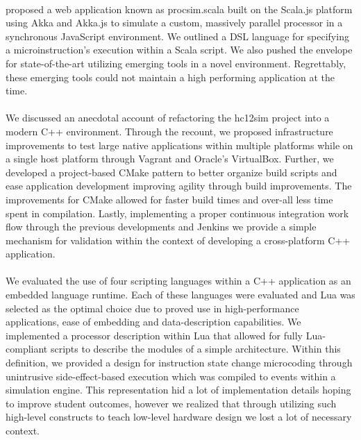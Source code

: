 \paragraph{}  proposed a web application known as procsim.scala built on the Scala.js platform using Akka and Akka.js to simulate a custom, massively parallel processor in a synchronous JavaScript environment. We outlined a DSL language for specifying a microinstruction's execution within a Scala script. We also pushed the envelope for state-of-the-art utilizing emerging tools in a novel environment. Regrettably, these emerging tools could not maintain a high performing application at the time.

\paragraph{} We discussed an anecdotal account of refactoring the hc12sim project into a modern C++ environment. Through the recount, we proposed infrastructure improvements to test large native applications within multiple platforms while on a single host platform through Vagrant and Oracle's VirtualBox. Further, we developed a project-based CMake pattern to better organize build scripts and ease application development improving agility through build improvements. The improvements for CMake allowed for faster build times and over-all less time spent in compilation. Lastly, implementing a proper continuous integration work flow through the previous developments and Jenkins we provide a simple mechanism for validation within the context of developing a cross-platform C++ application.

\paragraph{} We evaluated the use of four scripting languages within a C++ application as an embedded language runtime. Each of these languages were evaluated and Lua was selected as the optimal choice due to proved use in high-performance applications, ease of embedding and data-description capabilities. We implemented a processor description within Lua that allowed for fully Lua-compliant scripts to describe the modules of a simple architecture. Within this definition, we provided a design for instruction state change microcoding through unintrusive side-effect-based execution which was compiled to events within a simulation engine. This representation hid a lot of implementation details hoping to improve student outcomes, however we realized that through utilizing such high-level constructs to teach low-level hardware design we lost a lot of necessary context.

